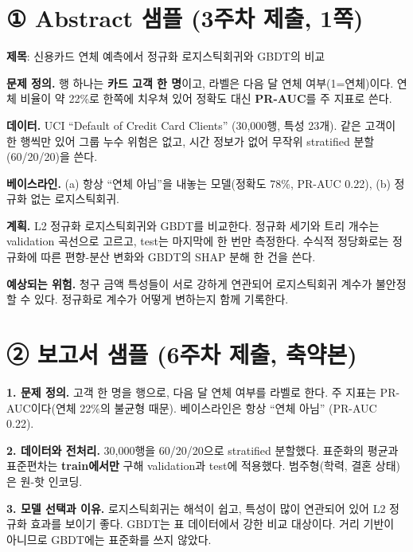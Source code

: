 \documentclass[11pt]{article}
\begin{document}


\section*{① Abstract 샘플 (3주차 제출, 1쪽)}
\noindent\textbf{제목}: 신용카드 연체 예측에서 정규화 로지스틱회귀와 GBDT의 비교

\vspace{4pt}
\noindent\textbf{문제 정의.} 행 하나는 \textbf{카드 고객 한 명}이고, 라벨은 다음 달 연체 여부(1=연체)이다. 연체 비율이 약 22\%로 한쪽에 치우쳐 있어 정확도 대신 \textbf{PR-AUC}를 주 지표로 쓴다.

\noindent\textbf{데이터.} UCI ``Default of Credit Card Clients'' (30{,}000행, 특성 23개). 같은 고객이 한 행씩만 있어 그룹 누수 위험은 없고, 시간 정보가 없어 무작위 stratified 분할(60/20/20)을 쓴다.

\noindent\textbf{베이스라인.} (a) 항상 ``연체 아님''을 내놓는 모델(정확도 78\%, PR-AUC 0.22), (b) 정규화 없는 로지스틱회귀.

\noindent\textbf{계획.} L2 정규화 로지스틱회귀와 GBDT를 비교한다. 정규화 세기와 트리 개수는 validation 곡선으로 고르고, test는 마지막에 한 번만 측정한다. 수식적 정당화로는 정규화에 따른 편향-분산 변화와 GBDT의 SHAP 분해 한 건을 쓴다.

\noindent\textbf{예상되는 위험.} 청구 금액 특성들이 서로 강하게 연관되어 로지스틱회귀 계수가 불안정할 수 있다. 정규화로 계수가 어떻게 변하는지 함께 기록한다.

\newpage
\section*{② 보고서 샘플 (6주차 제출, 축약본)}
\noindent\textbf{1. 문제 정의.} 고객 한 명을 행으로, 다음 달 연체 여부를 라벨로 한다. 주 지표는 PR-AUC이다(연체 22\%의 불균형 때문). 베이스라인은 항상 ``연체 아님'' (PR-AUC 0.22).

\noindent\textbf{2. 데이터와 전처리.} 30{,}000행을 60/20/20으로 stratified 분할했다. 표준화의 평균과 표준편차는 \textbf{train에서만} 구해 validation과 test에 적용했다. 범주형(학력, 결혼 상태)은 원-핫 인코딩.

\noindent\textbf{3. 모델 선택과 이유.} 로지스틱회귀는 해석이 쉽고, 특성이 많이 연관되어 있어 L2 정규화 효과를 보이기 좋다. GBDT는 표 데이터에서 강한 비교 대상이다. 거리 기반이 아니므로 GBDT에는 표준화를 쓰지 않았다.
\end{document}
